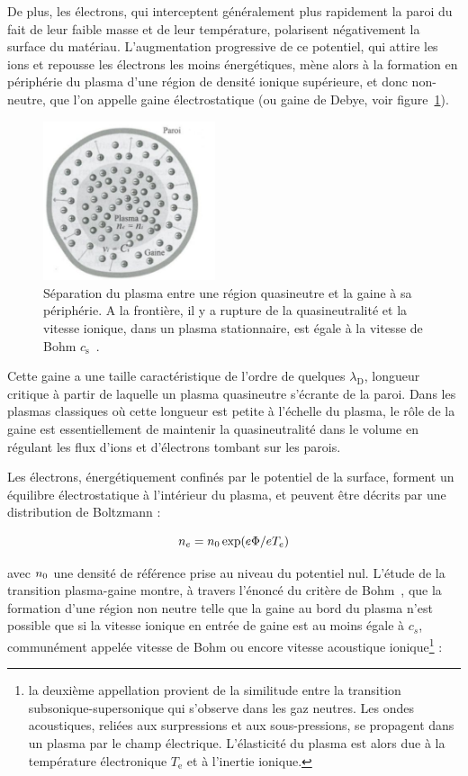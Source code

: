 \begin{refsection}
De plus, les électrons, qui interceptent généralement
plus rapidement la paroi du fait de leur faible masse et de leur température,
polarisent négativement la surface du matériau.
L'augmentation progressive de ce potentiel, qui attire les ions et repousse les
électrons les moins énergétiques, mène alors à la formation en périphérie du
plasma d'une région de densité ionique supérieure, et donc non-neutre, que l'on
appelle gaine électrostatique (ou gaine de Debye, voir figure~\ref{1-gaine1}).

\begin{figure}[htbp]
\centering
\includegraphics[width=0.45\textwidth]{figures/1-sheath.jpg}{\caption{Séparation
du plasma entre une région quasineutre et la gaine à sa
périphérie. A la frontière, il y a rupture de la quasineutralité et la vitesse
ionique, dans un plasma stationnaire, est égale à la vitesse de Bohm
$c_\text{s}$~\parencite{Rax}.}\label{1-gaine1}}
\end{figure}

Cette gaine a une taille caractéristique de l'ordre de quelques
$\lambda_\text{D}$, longueur critique à partir de laquelle un plasma
quasineutre s'écrante de la paroi. Dans les plasmas classiques où cette longueur
est petite à l'échelle du plasma, le rôle de la gaine est essentiellement de
maintenir la quasineutralité dans le volume en régulant les flux d'ions et
d'électrons tombant sur les parois. 

Les électrons, énergétiquement confinés
par le potentiel de la surface, forment un équilibre électrostatique à l'intérieur du
plasma, et peuvent être décrits par une distribution de Boltzmann :

\begin{equation}
	n_{e}=n{_{0}}\exp(e\Phi/eT_{e})
\end{equation}

avec $n{_{0}}$ une densité de référence prise au niveau du potentiel nul.
L'étude de la transition plasma-gaine montre,
à travers l'énoncé du critère de Bohm~\parencite{Stangeby}, que
la formation d'une région non neutre telle que la gaine au bord du plasma n'est
possible que si la vitesse ionique en entrée de gaine est au moins égale à
$c_s$, communément appelée vitesse de Bohm ou encore vitesse acoustique
ionique\footnote{la deuxième appellation provient de la similitude entre la
transition subsonique-supersonique qui s'observe dans les gaz neutres. Les
ondes acoustiques, reliées aux surpressions et aux sous-pressions, se propagent
dans un plasma par le champ électrique. L'élasticité du plasma est alors due à
la température électronique $T_\text{e}$ et à l'inertie ionique.} :


\end{refsection}
